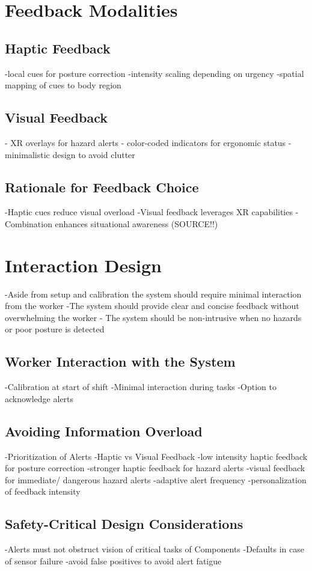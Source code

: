 \section{Feedback Modalities}
\subsection{Haptic Feedback}
-local cues for posture correction
-intensity scaling depending on urgency
-spatial mapping of cues to body region
\subsection{Visual Feedback}
- XR overlays for hazard alerts
- color-coded indicators for ergonomic status
- minimalistic design to avoid clutter

\subsection{Rationale for Feedback Choice}
-Haptic cues reduce visual overload
-Visual feedback leverages XR capabilities
-Combination enhances situational awareness (SOURCE!!)

\section{Interaction Design}
-Aside from setup and calibration the system should require minimal interaction from the worker
-The system should provide clear and concise feedback without overwhelming the worker
- The system should be non-intrusive when no hazards or poor posture is detected
\subsection{Worker Interaction with the System}
-Calibration at start of shift
-Minimal interaction during tasks
-Option to acknowledge alerts

\subsection{Avoiding Information Overload}
-Prioritization of Alerts
-Haptic vs Visual Feedback
-low intensity haptic feedback for posture correction
-stronger haptic feedback for hazard alerts
-visual feedback for immediate/ dangerous hazard alerts
-adaptive alert frequency 
-personalization of feedback intensity

\subsection{Safety-Critical Design Considerations}
-Alerts must not obstruct vision of critical tasks of Components
-Defaults in case of sensor failure
-avoid false positives to avoid alert fatigue


